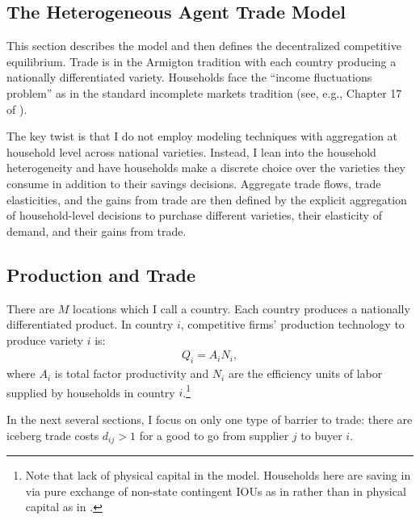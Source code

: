\documentclass[12pt,pdftex]{article}
\begin{document}
\begin{onehalfspacing}
\section{The Heterogeneous Agent Trade Model}

This section describes the model and then defines the decentralized competitive equilibrium. Trade is in the Armigton tradition with each country producing a nationally differentiated variety. Households face the ``income fluctuations problem'' as in the standard incomplete markets tradition (see, e.g., Chapter 17 of \citet{ljungqvist2012recursive}).

The key twist is that I do not employ modeling techniques with aggregation at household level across national varieties. Instead, I lean into the household heterogeneity and have households make a discrete choice over the varieties they consume in addition to their savings decisions. Aggregate trade flows, trade elasticities, and the gains from trade are then defined by the explicit aggregation of household-level decisions to purchase different varieties, their elasticity of demand, and their gains from trade.

\subsection{Production and Trade}\label{sec:trade}

There are $M$ locations which I call a country. Each country produces a nationally differentiated product. In country $i$, competitive firms' production technology to produce variety $i$ is:
\begin{align}
Q_i = A_i N_i,
\label{eq:production}
\end{align}
where $A_i$ is total factor productivity and $N_i$ are the efficiency units of labor supplied by households in country $i$.\footnote{Note that lack of physical capital in the model. Households here are saving in via pure exchange of non-state contingent IOUs as in \citet{huggett1993risk} rather than in physical capital as in \citet{aiyagari1994uninsured}.}

In the next several sections, I focus on only one type of barrier to trade: there are iceberg trade costs $d_{ij} > 1$ for a good to go from supplier $j$ to buyer $i$.


\end{onehalfspacing}
\end{document}
